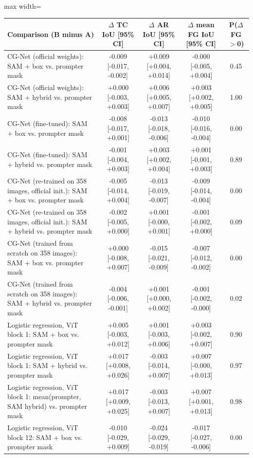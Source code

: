 \begin{table}[htbp]
\centering
\small
\begin{adjustbox}{max width=\linewidth}
\begin{tabular}{lcccc}
\toprule
Comparison (B minus A) & $\Delta$ TC IoU [95\% CI] & $\Delta$ AR IoU [95\% CI] & $\Delta$ mean FG IoU [95\% CI] & P($\Delta$FG$>$0) \\
\midrule
CG-Net (official weights): SAM + box vs. prompter mask & -0.009 [-0.017, -0.002] & +0.009 [+0.004, +0.014] & -0.000 [-0.005, +0.004] & 0.45 \\
CG-Net (official weights): SAM + hybrid vs. prompter mask & +0.000 [-0.003, +0.003] & +0.006 [+0.005, +0.007] & +0.003 [+0.002, +0.005] & 1.00 \\
CG-Net (fine-tuned): SAM + box vs. prompter mask & -0.008 [-0.017, +0.001] & -0.013 [-0.018, -0.006] & -0.010 [-0.016, -0.004] & 0.00 \\
CG-Net (fine-tuned): SAM + hybrid vs. prompter mask & -0.001 [-0.004, +0.003] & +0.003 [+0.002, +0.004] & +0.001 [-0.001, +0.003] & 0.89 \\
CG-Net (re-trained on 358 images, official init.): SAM + box vs. prompter mask & -0.005 [-0.014, +0.004] & -0.013 [-0.019, -0.007] & -0.009 [-0.014, -0.004] & 0.00 \\
CG-Net (re-trained on 358 images, official init.): SAM + hybrid vs. prompter mask & -0.002 [-0.005, +0.000] & +0.001 [-0.000, +0.001] & -0.001 [-0.002, +0.000] & 0.09 \\
CG-Net (trained from scratch on 358 images): SAM + box vs. prompter mask & +0.000 [-0.008, +0.007] & -0.015 [-0.021, -0.009] & -0.007 [-0.012, -0.002] & 0.00 \\
CG-Net (trained from scratch on 358 images): SAM + hybrid vs. prompter mask & -0.004 [-0.006, -0.001] & +0.001 [+0.000, +0.002] & -0.001 [-0.002, -0.000] & 0.02 \\
Logistic regression, ViT block 1: SAM + box vs. prompter mask & +0.005 [-0.003, +0.012] & +0.001 [-0.003, +0.006] & +0.003 [-0.002, +0.007] & 0.90 \\
Logistic regression, ViT block 1: SAM + hybrid vs. prompter mask & +0.017 [+0.008, +0.026] & -0.003 [-0.014, +0.007] & +0.007 [-0.000, +0.013] & 0.97 \\
Logistic regression, ViT block 1: mean(prompter, SAM hybrid) vs. prompter mask & +0.017 [+0.009, +0.025] & -0.003 [-0.013, +0.007] & +0.007 [+0.001, +0.013] & 0.98 \\
Logistic regression, ViT block 12: SAM + box vs. prompter mask & -0.010 [-0.029, +0.009] & -0.024 [-0.029, -0.019] & -0.017 [-0.027, -0.006] & 0.00 \\

\end{tabular}
\end{adjustbox}
\end{table}
